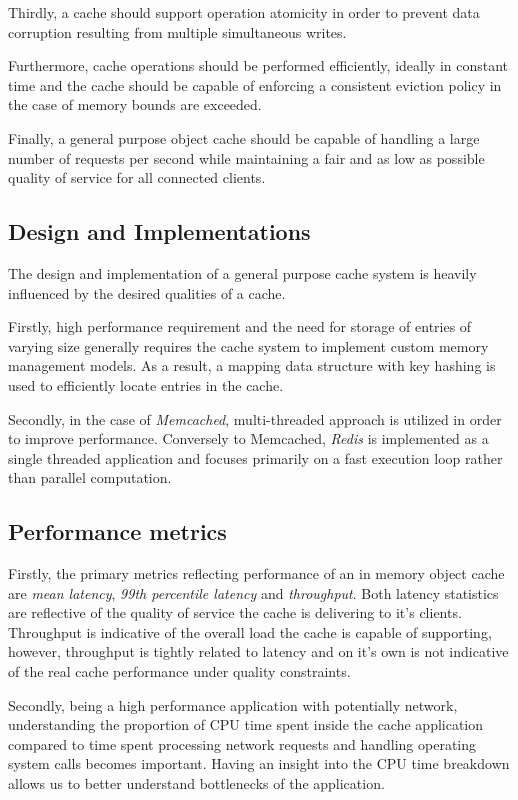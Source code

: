 Thirdly, a cache should support operation atomicity in order to prevent data corruption resulting from multiple simultaneous writes.

Furthermore, cache operations should be performed efficiently, ideally in constant time and the cache should be capable of enforcing a consistent eviction policy in the case of memory bounds are exceeded.

Finally, a general purpose object cache should be capable of handling a large number of requests per second while maintaining a fair and as low as possible quality of service for all connected clients.


\subsection{Design and Implementations}
The design and implementation of a general purpose cache system is heavily influenced by the desired qualities of a cache.

Firstly, high performance requirement and the need for storage of entries of varying size generally requires the cache system to implement custom memory management models. As a result, a mapping data structure  with key hashing is used to efficiently locate entries in the cache.

Secondly, in the case of \textit{Memcached}, multi-threaded approach is utilized in order to improve performance. Conversely to Memcached, \textit{Redis} is implemented as a single threaded application and focuses primarily on a fast execution loop rather than parallel computation.


\subsection{Performance metrics}
Firstly, the primary metrics reflecting performance of an in memory object cache are \textit{mean latency}, \textit{99th percentile latency} and \textit{throughput}. Both latency statistics are reflective of the quality of service the cache is delivering to it's clients. Throughput is indicative of the overall load the cache is capable of supporting, however, throughput is tightly related to latency and on it's own is not indicative of the real cache performance under quality constraints.

Secondly, being a high performance application with potentially network, understanding the proportion of CPU time spent inside the cache application compared to time spent processing network requests and handling operating system calls becomes important. Having an insight into the CPU time breakdown allows us to better understand bottlenecks of the application.

